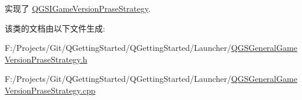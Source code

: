 实现了 \mbox{\hyperlink{class_q_g_s_i_game_version_prase_strategy_a6670763377fd8f61b9f84198b432dbf5}{Q\+G\+S\+I\+Game\+Version\+Prase\+Strategy}}.



该类的文档由以下文件生成\+:\begin{DoxyCompactItemize}
\item 
F\+:/\+Projects/\+Git/\+Q\+Getting\+Started/\+Q\+Getting\+Started/\+Launcher/\mbox{\hyperlink{_q_g_s_general_game_version_prase_strategy_8h}{Q\+G\+S\+General\+Game\+Version\+Prase\+Strategy.\+h}}\item 
F\+:/\+Projects/\+Git/\+Q\+Getting\+Started/\+Q\+Getting\+Started/\+Launcher/\mbox{\hyperlink{_q_g_s_general_game_version_prase_strategy_8cpp}{Q\+G\+S\+General\+Game\+Version\+Prase\+Strategy.\+cpp}}\end{DoxyCompactItemize}
